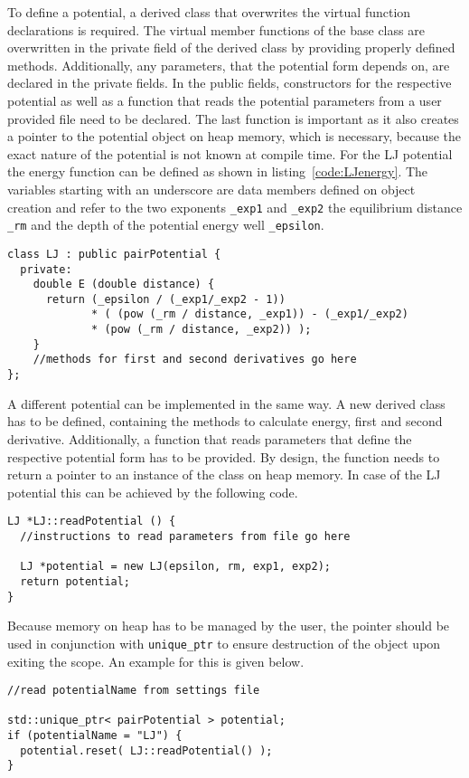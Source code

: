 To define a potential, a derived class that overwrites the virtual function
declarations is required. The virtual member functions of the base class are
overwritten in the private field of the derived class by providing properly
defined methods. Additionally, any parameters, that the potential form depends
on, are declared in the private fields. In the public fields, constructors for
the respective potential as well as a function that reads the potential
parameters from a user provided file need to be declared. The last function is
important as it also creates a pointer to the potential object on heap memory,
which is necessary, because the exact nature of the potential is not known at
compile time. For the \ac{LJ} potential the energy function can be defined as
shown in listing~\ref{code:LJenergy}. The variables starting with an underscore
are data members defined on object creation and refer to the two exponents
\texttt{\_exp1} and \texttt{\_exp2} the equilibrium distance \texttt{\_rm} and the
depth of the potential energy well \texttt{\_epsilon}.
%
\begin{lstlisting}[caption={Implementation of the distance dependant energy for the Lennard-Jones potential.},label=code:LJenergy,float=htb]
class LJ : public pairPotential {
  private:
    double E (double distance) {
      return (_epsilon / (_exp1/_exp2 - 1)) 
             * ( (pow (_rm / distance, _exp1)) - (_exp1/_exp2) 
             * (pow (_rm / distance, _exp2)) );
    }
    //methods for first and second derivatives go here
};
\end{lstlisting}
%
A different potential can be implemented in the same way. A new derived class
has to be defined, containing the methods to calculate energy, first and second
derivative. Additionally, a function that reads parameters that define the
respective potential form has to be provided. By design, the function needs to
return a pointer to an instance of the class on heap memory. In case of the
\ac{LJ} potential this can be achieved by the following code.
%
\begin{lstlisting}
LJ *LJ::readPotential () {
  //instructions to read parameters from file go here

  LJ *potential = new LJ(epsilon, rm, exp1, exp2);
  return potential;
}
\end{lstlisting}
%
Because memory on heap has to be managed by the user, the pointer should be used
in conjunction with \verb|unique_ptr| to ensure destruction of the object upon
exiting the scope. An example for this is given below.
%
\begin{lstlisting}
//read potentialName from settings file

std::unique_ptr< pairPotential > potential;
if (potentialName = "LJ") {
  potential.reset( LJ::readPotential() );
}
\end{lstlisting}

